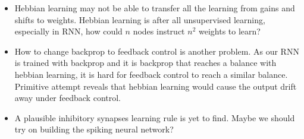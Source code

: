 \documentclass[12pt, a4paper]{article}
\begin{document}
\begin{itemize}
    \item Hebbian learning may not be able to transfer all the learning from gains and shifts to weights. Hebbian learning is after all unsupervised learning, especially in RNN, how could $n$ nodes instruct $n^2$ weights to learn?
    \item How to change backprop to feedback control is another problem. As our RNN is trained with backprop and it is backprop that reaches a balance with hebbian learning, it is hard for feedback control to reach a similar balance. Primitive attempt reveals that hebbian learning would cause the output drift away under feedback control.
    \item A plausible inhibitory synapses learning rule is yet to find. Maybe we should try on building the spiking neural network?
\end{itemize}

\newpage
\end{document}
